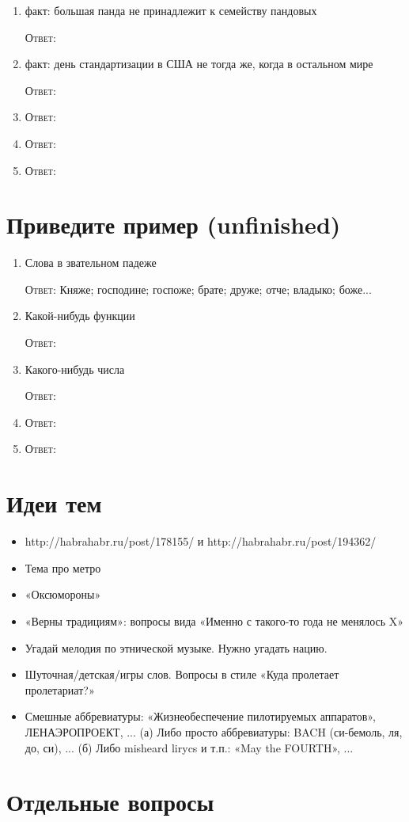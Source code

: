 \documentclass[a4paper,10pt]{article}
\let\keyword\textsc
\newenvironment{topic}{\begin{enumerate}}{\end{enumerate}}
\newcommand{\question}[3]{\item[#1.] #2 \par \keyword{Ответ:} #3}
\begin{document}
\begin{topic}
 \question{??}{факт: большая панда не принадлежит к семейству пандовых}{}
 \question{??}{факт: день стандартизации в США не тогда же, когда в остальном мире}{}
 \question{??}{}{}
 \question{??}{}{}
 \question{??}{}{}
\end{topic}


\section{Приведите пример (unfinished)}

\begin{topic}
 \question{??}{Слова в звательном падеже}{Княже; господине; госпоже; брате; друже; отче; владыко; боже...}
 \question{??}{Какой-нибудь функции}{}
 \question{??}{Какого-нибудь числа}{}
 \question{??}{}{}
 \question{??}{}{}
\end{topic}


\newpage
\section{Идеи тем}

\begin{itemize}
 \item http://habrahabr.ru/post/178155/ и http://habrahabr.ru/post/194362/
 \item Тема про метро
 \item «Оксюмороны»
 \item «Верны традициям»: вопросы вида «Именно с такого-то года не менялось X»
 \item Угадай мелодия по этнической музыке. Нужно угадать нацию.
 \item Шуточная/детская/игры слов. Вопросы в стиле «Куда пролетает пролетариат?»
 \item Смешные аббревиатуры: «Жизнеобеспечение пилотируемых аппаратов», ЛЕНАЭРОПРОЕКТ, ...
       (а) Либо просто аббревиатуры: BACH (си-бемоль, ля, до, си), ...
       (б) Либо misheard lirycs и т.п.: «May the FOURTH», ...
\end{itemize}


\section{Отдельные вопросы}
\end{document}
